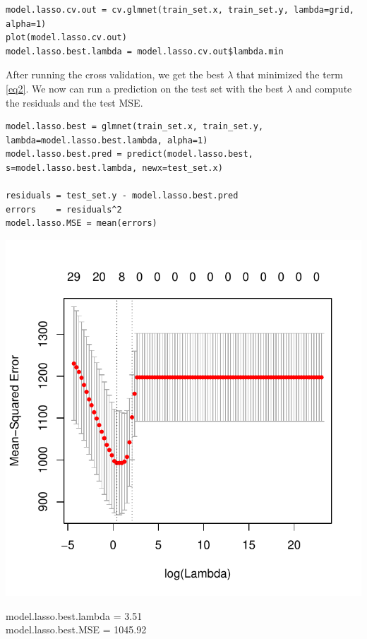 \documentclass[]{report}
\begin{document}
\begin{lstlisting}
model.lasso.cv.out = cv.glmnet(train_set.x, train_set.y, lambda=grid, alpha=1)
plot(model.lasso.cv.out)
model.lasso.best.lambda = model.lasso.cv.out$lambda.min
\end{lstlisting}

After running the cross validation, we get the best $\lambda$ that minimized the term \ref{eq2}. We now can run a prediction on the test set with the best $\lambda$ and compute the residuals and the test MSE.

\begin{lstlisting}
model.lasso.best = glmnet(train_set.x, train_set.y, lambda=model.lasso.best.lambda, alpha=1)
model.lasso.best.pred = predict(model.lasso.best, s=model.lasso.best.lambda, newx=test_set.x)

residuals = test_set.y - model.lasso.best.pred
errors    = residuals^2
model.lasso.MSE = mean(errors)

\end{lstlisting}

\begin{center}
	\includegraphics[width=0.8\linewidth]{Figures/lasso_mse.pdf}
\end{center}

\begin{center} 
	model.lasso.best.lambda = 3.51 \\
	model.lasso.best.MSE    = 1045.92
\end{center} 
\end{document}
